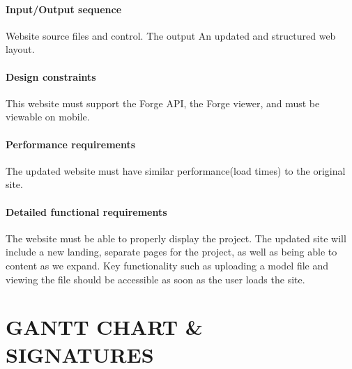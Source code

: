 \documentclass[letterpaper, 10pt, draftclsnofoot, compsoc, onecolumn]{IEEEtran}
\begin{document}
\paragraph[Input/Output sequence]{\rmfamily\bfseries\color{black}
Input/Output sequence }
{\color{black}
	Website source files and control. The output An updated and structured web layout.
}

\paragraph[Design constraints]{\rmfamily\bfseries\color{black} Design
constraints }
{\color{black}
	This website must support the Forge API, the Forge viewer, and must be viewable on mobile. 
}

\paragraph[Performance requirements]{\rmfamily\bfseries\color{black}
Performance requirements }
{\color{black}
	The updated website must have similar performance(load times) to the original site.
}

\paragraph[Detailed functional requirements]{\rmfamily\bfseries\color{black}
Detailed functional requirements }
{\color{black}
	The website must be able to properly display the project. The updated site will include a new landing,
	separate pages for the project, as well as being able to content as we expand. Key functionality such as uploading
	a model file and viewing the file should be accessible as soon as the user loads the site.   
}


\clearpage
\section[GANTT CHART/SIGNATURES]{\rmfamily\bfseries\color{black}
GANTT CHART \& SIGNATURES}
\end{document}
